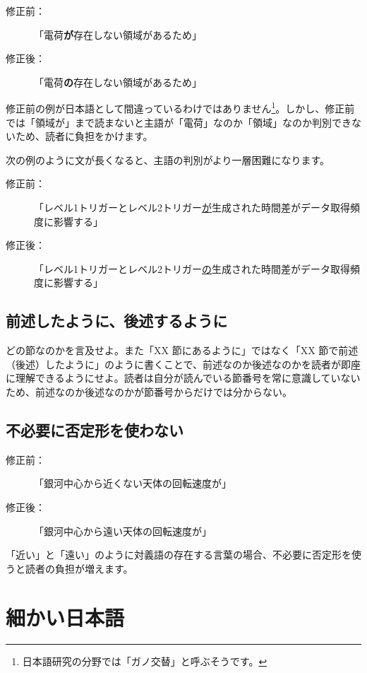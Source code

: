 \begin{description}
\item[修正前：]「電荷\textbf{が}存在しない領域があるため」
\item[修正後：]「電荷\textbf{の}存在しない領域があるため」
\end{description}

修正前の例が日本語として間違っているわけではありません\footnote{日本語研究の分野では「ガノ交替」と呼ぶそうです。}。しかし、修正前では「領域が」まで読まないと主語が「電荷」なのか「領域」なのか判別できないため、読者に負担をかけます。

次の例のように文が長くなると、主語の判別がより一層困難になります。

\begin{description}
\item[修正前：]「レベル1トリガーとレベル2トリガー\underline{が}生成された時間差がデータ取得頻度に影響する」
\item[修正後：]「レベル1トリガーとレベル2トリガー\underline{の}生成された時間差がデータ取得頻度に影響する」
\end{description}

\subsection{前述したように、後述するように}

どの節なのかを言及せよ。また「XX 節にあるように」ではなく「XX 節で前述（後述）したように」のように書くことで、前述なのか後述なのかを読者が即座に理解できるようにせよ。読者は自分が読んでいる節番号を常に意識していないため、前述なのか後述なのかが節番号からだけでは分からない。

\subsection{不必要に否定形を使わない}

\begin{description}
\item[修正前：]「銀河中心から近くない天体の回転速度が」
\item[修正後：]「銀河中心から遠い天体の回転速度が」
\end{description}

「近い」と「遠い」のように対義語の存在する言葉の場合、不必要に否定形を使うと読者の負担が増えます。

\section{細かい日本語}

